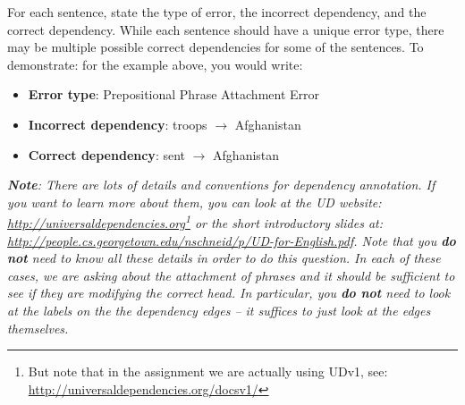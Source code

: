 \begin{parts}
    For each sentence, state the type of error, the incorrect dependency, and the correct dependency. While each sentence should have a unique error type, there may be multiple possible correct dependencies for some of the sentences.
    To demonstrate: for the example above, you would write:
    \begin{itemize}
        \item \textbf{Error type}: Prepositional Phrase Attachment Error
        \item \textbf{Incorrect dependency}: troops $\rightarrow$ Afghanistan
        \item \textbf{Correct dependency}: sent $\rightarrow$ Afghanistan
    \end{itemize}

    \textit{
        \textbf{Note}:
        There are lots of details and conventions for dependency annotation.
        If you want to learn more about them, you can look at the UD website: \url{http://universaldependencies.org}\footnote{But note that in the assignment we are actually using UDv1, see: \url{http://universaldependencies.org/docsv1/}} or the short introductory slides at: \url{http://people.cs.georgetown.edu/nschneid/p/UD-for-English.pdf}.
        Note that you \textbf{do not} need to know all these details in order to do this question. In each of these cases, we are asking about the attachment of phrases and it should be sufficient to see if they are modifying the correct head.
        In particular, you \textbf{do not} need to look at the labels on the the dependency edges -- it suffices to just look at the edges themselves.
    }


    

    \ifans{
    }\newline

\end{parts}
